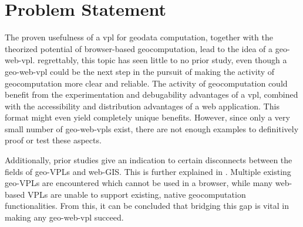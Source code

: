



\section{Problem Statement}

The proven usefulness of a vpl for geodata computation, together with the theorized potential of browser-based geocomputation, lead to the idea of a \ac{geo-web-vpl}. 
regrettably, this topic has seen little to no prior study, even though a \ac{geo-web-vpl} could be the next step in the pursuit of making the activity of geocomputation more clear and reliable.
The activity of geocomputation could benefit from the experimentation and debugability advantages of a \ac{vpl}, combined with the accessibility and distribution advantages of a web application.
This format might even yield completely unique benefits.
However, since only a very small number of geo-web-vpls exist, there are not enough examples to definitively proof or test these aspects. 

Additionally, prior studies give an indication to certain disconnects between the fields of geo-VPLs and web-GIS. 
This is further explained in .
Multiple existing geo-VPLs are encountered which cannot be used in a browser, while  many web-based VPLs are unable to support existing, native geocomputation functionalities. 
From this, it can be concluded that bridging this gap is vital in making any geo-web-vpl succeed. 

